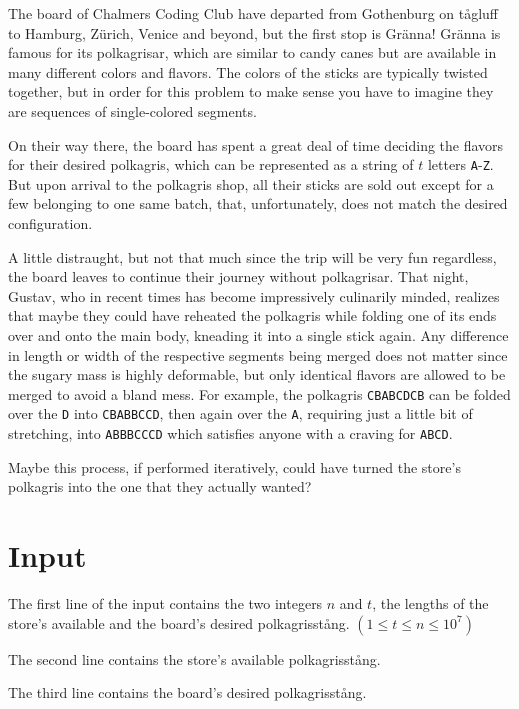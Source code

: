 \noindent

The board of Chalmers Coding Club have departed from Gothenburg on tågluff to Hamburg, Zürich,
Venice and beyond, but the first stop is Gränna! Gränna is famous for its polkagrisar, which are
similar to candy canes but are available in many different colors and flavors. The colors of the
sticks are typically twisted together, but in order for this problem to make sense you have to
imagine they are sequences of single-colored segments.

On their way there, the board has spent a great deal of time deciding the flavors for their desired
polkagris, which can be represented as a string of $t$ letters \verb|A|-\verb|Z|. But upon arrival
to the polkagris shop, all their sticks are sold out except for a few belonging to one same batch,
that, unfortunately, does not match the desired configuration.

A little distraught, but not that much since the trip will be very fun regardless, the board leaves
to continue their journey without polkagrisar. That night, Gustav, who in recent times has become
impressively culinarily minded, realizes that maybe they could have reheated the polkagris while
folding one of its ends over and onto the main body, kneading it into a single stick again. Any
difference in length or width of the respective segments being merged does not matter since the
sugary mass is highly deformable, but only identical flavors are allowed to be merged to avoid a
bland mess. For example, the polkagris \verb|CBABCDCB| can be folded over the \verb|D| into
\verb|CBABBCCD|, then again over the \verb|A|, requiring just a little bit of stretching, into
\verb|ABBBCCCD| which satisfies anyone with a craving for \verb|ABCD|.

Maybe this process, if performed iteratively, could have turned the store's polkagris
into the one that they actually wanted?

\section*{Input}

The first line of the input contains the two integers $n$ and $t$, the lengths of the store's
available and the board's desired polkagrisstång. $(1 \leq t \leq n \leq 10^7)$

The second line contains the store's available polkagrisstång.

The third line contains the board's desired polkagrisstång.

